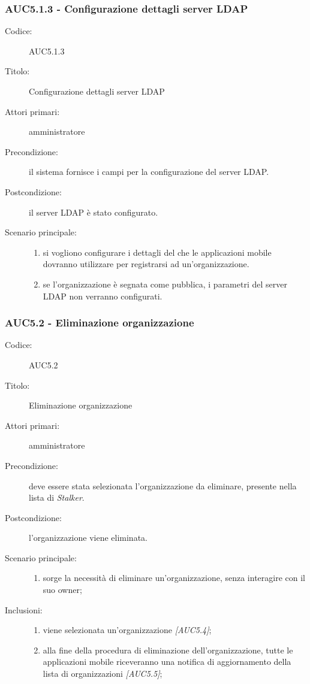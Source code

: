\documentclass[../../../analisi-dei-requisiti.tex]{subfiles}
\begin{document}
\subsubsection{AUC5.1.3 - Configurazione dettagli server LDAP}%
  \label{subsub:AUC5.1.3}
  \begin{description}
    \item[Codice:] AUC5.1.3
    \item[Titolo:] Configurazione dettagli server LDAP
    \item[Attori primari:] amministratore
    \item[Precondizione:] il sistema fornisce i campi per la configurazione del server LDAP.
    \item[Postcondizione:] il server LDAP è stato configurato.
    \item[Scenario principale:]
    \begin{enumerate}
      \item si vogliono configurare i dettagli del  che le applicazioni mobile dovranno utilizzare per registrarsi ad un'organizzazione.
      \item se l'organizzazione è segnata come pubblica, i parametri del server LDAP non verranno configurati.
    \end{enumerate}
  \end{description}

\subsubsection{AUC5.2 - Eliminazione organizzazione}%
\label{subsub:AUC5.2}
\begin{description}
  \item[Codice:] AUC5.2
  \item[Titolo:] Eliminazione organizzazione
  \item[Attori primari:] amministratore
  \item[Precondizione:] deve essere stata selezionata l'organizzazione da eliminare, presente nella lista di \emph{Stalker}.
  \item[Postcondizione:] l'organizzazione viene eliminata.
  \item[Scenario principale:]
  \begin{enumerate}
    \item sorge la necessità di eliminare un'organizzazione, senza interagire con il suo owner;
  \end{enumerate}
  \item[Inclusioni:]
  \begin{enumerate}
    \item viene selezionata un'organizzazione \emph{[AUC5.4]};
    \item alla fine della procedura di eliminazione dell'organizzazione, tutte le applicazioni mobile riceveranno una notifica di aggiornamento della lista di organizzazioni \emph{[AUC5.5]};
  \end{enumerate}
\end{description}
\end{document}
